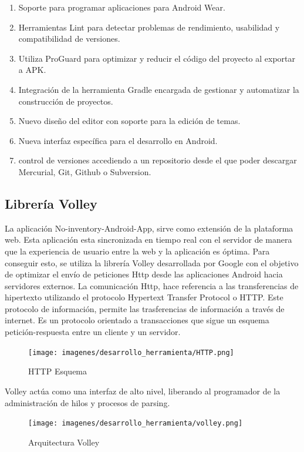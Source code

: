 \documentclass[a4paper,11pt]{book}
\begin{document}
\begin{enumerate}
\item Soporte para programar aplicaciones para Android Wear.
\item Herramientas Lint para detectar problemas de rendimiento, usabilidad y compatibilidad de versiones.
\item Utiliza ProGuard para optimizar y reducir el código del proyecto al exportar a APK.\item Integración de la herramienta Gradle encargada de gestionar y automatizar la construcción de proyectos.
\item Nuevo diseño del editor con soporte para la edición de temas. 
\item Nueva interfaz específica para el desarrollo en Android.
\item control de versiones accediendo a un repositorio desde el que poder descargar Mercurial, Git, Github o Subversion. 
\end{enumerate}

\subsection{Librería Volley}
La aplicación No-inventory-Android-App, sirve como extensión de la plataforma web. Esta aplicación esta sincronizada en tiempo real con el servidor de manera que la experiencia de usuario entre la web y la aplicación es óptima.  Para conseguir esto, se utiliza la librería Volley\cite{volley} desarrollada por Google con el objetivo de optimizar el envío de peticiones Http desde las aplicaciones Android hacia servidores externos. La comunicación Http, hace referencia a las transferencias de hipertexto utilizando el protocolo Hypertext Transfer Protocol o HTTP\cite{http}. Este protocolo de información, permite las trasferencias de información a través de internet. Es un protocolo orientado a transacciones que sigue un esquema petición-respuesta entre un cliente y un servidor. 

\begin{figure}[H] 
\centering 
\texttt{[image: imagenes/desarrollo\_herramienta/HTTP.png]}
\caption{ HTTP Esquema\cite{httpD}}
\end{figure}

Volley actúa como una interfaz de alto nivel, liberando al programador de la administración de hilos y procesos de parsing. 


\begin{figure}[H] 
\centering 
\texttt{[image: imagenes/desarrollo\_herramienta/volley.png]}
\caption{ Arquitectura Volley\cite{volley2}}
\end{figure}
\end{document}
